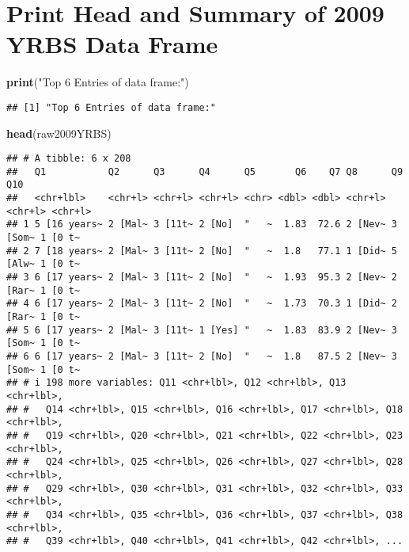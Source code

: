 \documentclass[
]{article}
\newenvironment{Shaded}{\begin{snugshade}}{\end{snugshade}}
\newcommand{\FunctionTok}[1]{\textcolor[rgb]{0.13,0.29,0.53}{\textbf{#1}}}
\newcommand{\NormalTok}[1]{#1}
\newcommand{\StringTok}[1]{\textcolor[rgb]{0.31,0.60,0.02}{#1}}
\begin{document}
\hypertarget{print-head-and-summary-of-2009-yrbs-data-frame}{%
\section{Print Head and Summary of 2009 YRBS Data
Frame}\label{print-head-and-summary-of-2009-yrbs-data-frame}}

\begin{Shaded}
\begin{Highlighting}[]
\FunctionTok{print}\NormalTok{(}\StringTok{"Top 6 Entries of data frame:"}\NormalTok{)}
\end{Highlighting}
\end{Shaded}

\begin{verbatim}
## [1] "Top 6 Entries of data frame:"
\end{verbatim}

\begin{Shaded}
\begin{Highlighting}[]
\FunctionTok{head}\NormalTok{(raw2009YRBS)}
\end{Highlighting}
\end{Shaded}

\begin{verbatim}
## # A tibble: 6 x 208
##   Q1           Q2      Q3      Q4      Q5       Q6    Q7 Q8      Q9      Q10    
##   <chr+lbl>    <chr+l> <chr+l> <chr+l> <chr> <dbl> <dbl> <chr+l> <chr+l> <chr+l>
## 1 5 [16 years~ 2 [Mal~ 3 [11t~ 2 [No]  "   ~  1.83  72.6 2 [Nev~ 3 [Som~ 1 [0 t~
## 2 7 [18 years~ 2 [Mal~ 3 [11t~ 2 [No]  "   ~  1.8   77.1 1 [Did~ 5 [Alw~ 1 [0 t~
## 3 6 [17 years~ 2 [Mal~ 3 [11t~ 2 [No]  "   ~  1.93  95.3 2 [Nev~ 2 [Rar~ 1 [0 t~
## 4 6 [17 years~ 2 [Mal~ 3 [11t~ 2 [No]  "   ~  1.73  70.3 1 [Did~ 2 [Rar~ 1 [0 t~
## 5 6 [17 years~ 2 [Mal~ 3 [11t~ 1 [Yes] "   ~  1.83  83.9 2 [Nev~ 3 [Som~ 1 [0 t~
## 6 6 [17 years~ 2 [Mal~ 3 [11t~ 2 [No]  "   ~  1.8   87.5 2 [Nev~ 3 [Som~ 1 [0 t~
## # i 198 more variables: Q11 <chr+lbl>, Q12 <chr+lbl>, Q13 <chr+lbl>,
## #   Q14 <chr+lbl>, Q15 <chr+lbl>, Q16 <chr+lbl>, Q17 <chr+lbl>, Q18 <chr+lbl>,
## #   Q19 <chr+lbl>, Q20 <chr+lbl>, Q21 <chr+lbl>, Q22 <chr+lbl>, Q23 <chr+lbl>,
## #   Q24 <chr+lbl>, Q25 <chr+lbl>, Q26 <chr+lbl>, Q27 <chr+lbl>, Q28 <chr+lbl>,
## #   Q29 <chr+lbl>, Q30 <chr+lbl>, Q31 <chr+lbl>, Q32 <chr+lbl>, Q33 <chr+lbl>,
## #   Q34 <chr+lbl>, Q35 <chr+lbl>, Q36 <chr+lbl>, Q37 <chr+lbl>, Q38 <chr+lbl>,
## #   Q39 <chr+lbl>, Q40 <chr+lbl>, Q41 <chr+lbl>, Q42 <chr+lbl>, ...
\end{verbatim}
\end{document}
